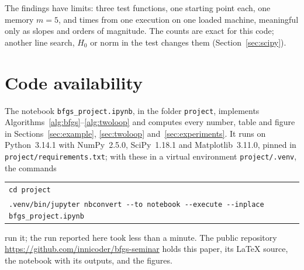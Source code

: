 \documentclass[11pt,a4paper]{amsart}
\numberwithin{equation}{section}
\theoremstyle{plain}
\theoremstyle{definition}
\theoremstyle{remark}
\newcommand{\code}[1]{\texttt{#1}}
\begin{document}
The findings have limits: three test functions, one starting point
each, one memory $m = 5$, and times from one execution on one loaded
machine, meaningful only as slopes and orders of magnitude. The counts
are exact for this code; another line search, $H_0$ or norm in the test
changes them (Section~\ref{sec:scipy}).

\section*{Code availability}

The notebook \nolinkurl{bfgs_project.ipynb}, in the folder
\nolinkurl{project}, implements
Algorithms~\ref{alg:bfgs}--\ref{alg:twoloop} and computes every number,
table and figure in Sections~\ref{sec:example}, \ref{sec:twoloop}
and~\ref{sec:experiments}. It runs on Python~3.14.1 with NumPy~2.5.0,
SciPy~1.18.1 and Matplotlib~3.11.0, pinned in
\nolinkurl{project/requirements.txt}; with these in a virtual
environment \nolinkurl{project/.venv}, the commands
\begin{center}\scriptsize
\begin{tabular}{@{}l@{}}
  \code{cd project}\\
  \code{.venv/bin/jupyter nbconvert -{}-to notebook -{}-execute
    -{}-inplace bfgs\_project.ipynb}
\end{tabular}
\end{center}
run it; the run reported here took less than a minute. The public
repository \url{https://github.com/innicoder/bfgs-seminar} holds this
paper, its LaTeX source, the notebook with its outputs, and the figures.

\printbibliography
\end{document}
